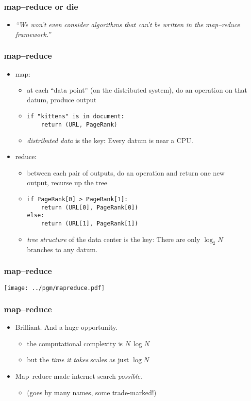 \documentclass[pdftex]{beamer}
\begin{document}
\begin{frame}
  \frametitle{map--reduce or die}
  \begin{itemize}
  \item \textsl{``We won't even consider algorithms that can't be
    written in the map--reduce framework.''}
  \end{itemize}
\end{frame}

\begin{frame}
  \frametitle{map--reduce}
  \begin{itemize}
  \item map:
    \begin{itemize}
    \item at each ``data point'' (on the distributed system), do an
      operation on that datum, produce output
    \item \texttt{if "kittens" is in document: \\ ~~~~return (URL, PageRank)}
    \item \emph{distributed data} is the key: Every datum is near a
      CPU.
    \end{itemize}
  \item reduce:
    \begin{itemize}
    \item between each pair of outputs, do an operation and return one
      new output, recurse up the tree
    \item \texttt{if PageRank[0] > PageRank[1]: \\ ~~~~return (URL[0], PageRank[0]) \\ else: \\ ~~~~return (URL[1], PageRank[1])}
    \item \emph{tree structure} of the data center is the key: There are only
      $\log_2 N$ branches to any datum.
    \end{itemize}
  \end{itemize}
\end{frame}

\begin{frame}
  \frametitle{map--reduce}
  \texttt{[image: ../pgm/mapreduce.pdf]}
\end{frame}

\begin{frame}
  \frametitle{map--reduce}
  \begin{itemize}
  \item Brilliant.  And a huge opportunity.
    \begin{itemize}
    \item the computational complexity is $N\,\log N$
    \item but the \emph{time it takes} scales as just $\log N$
    \end{itemize}
  \item Map--reduce made internet search \emph{possible}.
    \begin{itemize}
    \item (goes by many names, some trade-marked!)
    \end{itemize}
  \end{itemize}
\end{frame}
\end{document}
